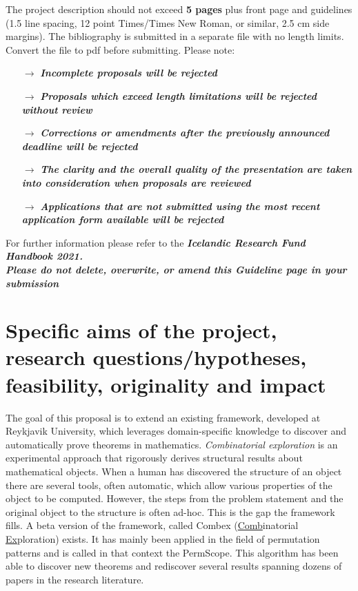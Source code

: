 \documentclass{rannis}
\newcommand{\motheralg}{\textsf{Combex}}
\newcommand{\explofmothername}{\underline{Comb}inatorial \underline{Ex}ploration}
\newcommand{\tilealg}{\textsf{PermScope}}
\theoremstyle{definition}
\begin{document}
\noindent
The project description should not exceed \textbf{5 pages} plus
front page and guidelines (1.5 line spacing, 12 point Times/Times New
Roman, or similar, 2.5 cm side margins). The \mbox{bibliography} is submitted
in a separate file with no length limits. Convert the file to pdf before submitting. Please note:

\begin{itemize}
\setlength\itemsep{-0.5em}
\item[$\rightarrow$]
  \emph{\textbf{Incomplete proposals will be rejected}}
\item[$\rightarrow$]
  \emph{\textbf{Proposals which exceed length limitations will be
  rejected without review}}
\item[$\rightarrow$]
  \emph{\textbf{Corrections or amendments after the previously announced
  deadline will be rejected}}
\item[$\rightarrow$]
  \emph{\textbf{The clarity and the overall quality of the presentation
  are taken into consideration when proposals are reviewed}}
\item[$\rightarrow$]
  \emph{\textbf{Applications that are not submitted using the most
  recent application form available will be rejected}}\\
\end{itemize}

\noindent
For further information please refer to the \emph{\textbf{Icelandic
Research Fund Handbook 2021.}}\\

\emph{\textbf{Please do not delete, overwrite, or amend this Guideline
page in your submission\\
}}

\newpage

\section{Specific aims of the project, research questions/hypotheses, feasibility, originality and impact}
The goal of this proposal is to extend an existing framework, developed at
Reykjavik University, which
leverages domain-specific knowledge to discover and automatically prove
theorems in mathematics.
\emph{Combinatorial exploration} is an experimental approach that
rigorously derives structural results about mathematical objects.
When a human has discovered the structure of an object there
are several tools, often automatic, which allow various properties of the object
to be computed. However, the steps from the problem statement and the original
object to the structure is often ad-hoc. This is the gap the framework fills.
A beta version of the framework, called
\motheralg{} (\explofmothername) exists. It has mainly been applied in
the field of permutation patterns and is called in that context the
\tilealg. This algorithm has been able
to discover new theorems and rediscover several results
spanning dozens of papers in the research literature.
\end{document}
